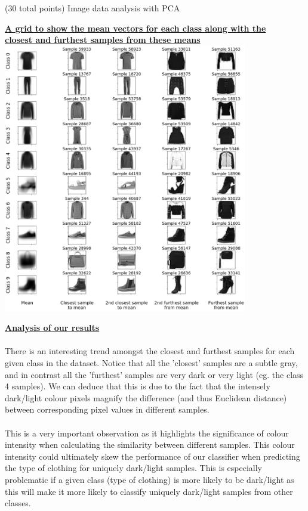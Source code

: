 \documentclass[12pt]{article}
\begin{document}
\begin{question}{(30 total points) Image data analysis with PCA}
\begin{subquestion}
  \begin{answerbox}{52em}
    \begin{center}
    \textbf{\underline{A grid to show the mean vectors for each class along with the}}\\
    \textbf{\underline{closest and furthest samples from these means}}
    \vspace{0.2cm}\\
    \includegraphics[width=0.8\textwidth]{images/q12.png}
    \end{center}
    \footnotesize{\textbf{\underline{Analysis of our results}}}\\
\\
    \scriptsize{
    There is an interesting trend amongst the closest and furthest samples for each given class in the dataset. Notice that all the 'closest' samples are a subtle gray, and in contrast all the 'furthest' samples are very dark or very light (eg. the class 4 samples). We can deduce that this is due to the fact that the intensely dark/light colour pixels magnify the difference (and thus Euclidean distance) between corresponding pixel values in different samples.\\
\\
    This is a very important observation as it highlights the significance of colour intensity when calculating the similarity between different samples. This colour intensity could ultimately skew the performance of our classifier when predicting the type of clothing for uniquely dark/light samples. This is especially problematic if a given class (type of clothing) is more likely to be dark/light as this will make it more likely to classify uniquely dark/light samples from other classes.\\
}
\end{answerbox}
\end{subquestion}
\end{question}
\end{document}
